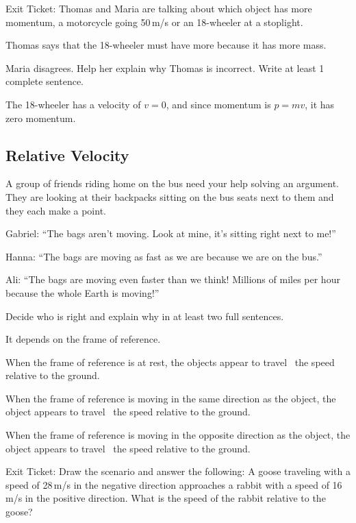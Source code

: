 \documentclass[]{exam}
\begin{document}
\begin{questions}
\question %
Exit Ticket: Thomas and Maria are talking about which object has more momentum, a motorcycle going 50\,m/s or an 18-wheeler at a stoplight. 

Thomas says that the 18-wheeler must have more because it has more mass. 

Maria disagrees. Help her explain why Thomas is incorrect. Write at least 1 complete sentence.

\begin{solution}
    The 18-wheeler has a velocity of $v = 0$, and since momentum is $p = mv$, it has zero momentum. 
\end{solution}

\clearpage
\begin{EnvUplevel}
    \subsection{Relative Velocity}
\end{EnvUplevel}

\question
A group of friends riding home on the bus need your help solving an argument. They are looking at their backpacks sitting on the bus seats next to them and they each make a point. 

Gabriel: ``The bags aren't moving. Look at mine, it’s sitting right next to me!''

Hanna: ``The bags are moving as fast as we are because we are on the bus.''

Ali: ``The bags are moving even faster than we think! Millions of miles per hour because the whole Earth is moving!''

Decide who is right and explain why in at least two full sentences.

\begin{solution}
    It depends on the frame of reference.
\end{solution}


\question
When the frame of reference is at rest, the objects appear to travel \fillin[equal to]\ the speed relative to the ground.

\question
When the frame of reference is moving in the same direction as the object, the object appears to travel \ the speed relative to the ground.

\question
When the frame of reference is moving in the opposite direction as the object, the object appears to travel \ the speed relative to the ground.

\question
Exit Ticket: Draw the scenario and answer the following: A goose traveling with a speed of 28\,m/s in the negative direction approaches a rabbit with a speed of 16\,m/s in the positive direction. What is the speed of the rabbit relative to the goose?


\end{questions}
\end{document}

